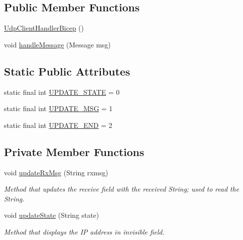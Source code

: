 \subsection*{Public Member Functions}
\begin{DoxyCompactItemize}
\item 
\mbox{\hyperlink{classcom_1_1example_1_1trainawearapplication_1_1_udp_client_handler_bicep_afa5c7cacbf23c1527423e8bf7c22abe1}{Udp\+Client\+Handler\+Bicep}} ()
\item 
void \mbox{\hyperlink{classcom_1_1example_1_1trainawearapplication_1_1_udp_client_handler_bicep_a083761d7050084ba7f64723dc178487a}{handle\+Message}} (Message msg)
\end{DoxyCompactItemize}
\subsection*{Static Public Attributes}
\begin{DoxyCompactItemize}
\item 
static final int \mbox{\hyperlink{classcom_1_1example_1_1trainawearapplication_1_1_udp_client_handler_bicep_aac92af19ef7bcdbebc31e78e1822bf61}{U\+P\+D\+A\+T\+E\+\_\+\+S\+T\+A\+TE}} = 0
\item 
static final int \mbox{\hyperlink{classcom_1_1example_1_1trainawearapplication_1_1_udp_client_handler_bicep_a4b12d585b9f99f7364e4295fd18e494e}{U\+P\+D\+A\+T\+E\+\_\+\+M\+SG}} = 1
\item 
static final int \mbox{\hyperlink{classcom_1_1example_1_1trainawearapplication_1_1_udp_client_handler_bicep_a70806fb9d5d3e9626218321b083d9b36}{U\+P\+D\+A\+T\+E\+\_\+\+E\+ND}} = 2
\end{DoxyCompactItemize}
\subsection*{Private Member Functions}
\begin{DoxyCompactItemize}
\item 
void \mbox{\hyperlink{classcom_1_1example_1_1trainawearapplication_1_1_udp_client_handler_bicep_a1f7d4b7fa7229fe47c39dff0b6dec3a2}{update\+Rx\+Msg}} (String rxmsg)
\begin{DoxyCompactList}\small\item\em Method that updates the receive field with the received String; used to read the String. \end{DoxyCompactList}\item 
void \mbox{\hyperlink{classcom_1_1example_1_1trainawearapplication_1_1_udp_client_handler_bicep_aaf087b8a72f9ea8baf46baca6dc4cdc1}{update\+State}} (String state)
\begin{DoxyCompactList}\small\item\em Method that displays the IP address in invisible field. \end{DoxyCompactList}\end{DoxyCompactItemize}
